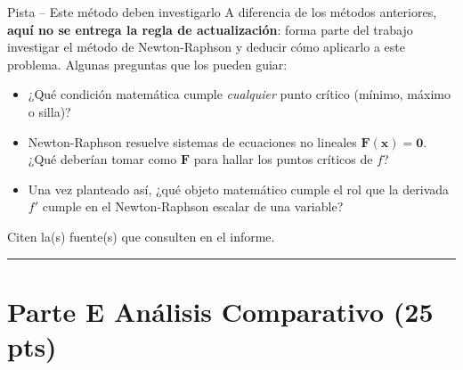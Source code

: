 \documentclass[12pt,a4paper]{article}
\begin{document}
\begin{ayuda}{Pista -- Este método deben investigarlo}
\vspace{2pt}
A diferencia de los métodos anteriores, \textbf{aquí no se entrega la regla de
actualización}: forma parte del trabajo investigar el método de Newton-Raphson
y deducir cómo aplicarlo a este problema. Algunas preguntas que los pueden
guiar:
\begin{itemize}[topsep=2pt]
    \item ¿Qué condición matemática cumple \emph{cualquier} punto crítico
          (mínimo, máximo o silla)?
    \item Newton-Raphson resuelve sistemas de ecuaciones no lineales
          $\mathbf{F}(\mathbf{x}) = \mathbf{0}$. ¿Qué deberían tomar como
          $\mathbf{F}$ para hallar los puntos críticos de $f$?
    \item Una vez planteado así, ¿qué objeto matemático cumple el rol que la
          derivada $f'$ cumple en el Newton-Raphson escalar de una variable?
\end{itemize}
Citen la(s) fuente(s) que consulten en el informe.
\end{ayuda}

\noindent\rule{\linewidth}{0.4pt}
\newpage
\section*{Parte E \quad Análisis Comparativo \hfill\normalfont\normalsize(25 pts)}
\end{document}
